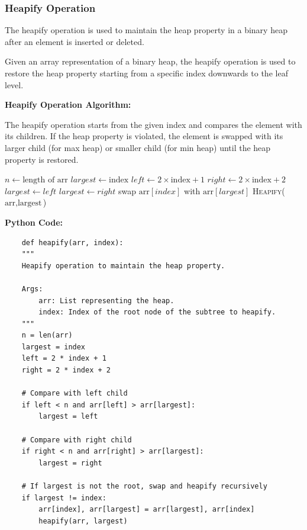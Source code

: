 \documentclass[12pt]{book} %
\begin{document}
\subsubsection{Heapify Operation}
The heapify operation is used to maintain the heap property in a binary heap after an element is inserted or deleted.

Given an array representation of a binary heap, the heapify operation is used to restore the heap property starting from a specific index downwards to the leaf level.

\textbf{Heapify Operation Algorithm:}

The heapify operation starts from the given index and compares the element with its children. If the heap property is violated, the element is swapped with its larger child (for max heap) or smaller child (for min heap) until the heap property is restored.
\FloatBarrier
\begin{algorithm}[H]
\caption{Heapify Operation}
\begin{algorithmic}[1]
    \State $n \gets \text{length of arr}$
    \State $largest \gets \text{index}$
    \State $left \gets 2 \times \text{index} + 1$
    \State $right \gets 2 \times \text{index} + 2$
        \State $largest \gets left$
    \EndIf
        \State $largest \gets right$
    \EndIf
        \State swap $\text{arr}[index]$ with $\text{arr}[largest]$
        \State \textsc{Heapify}($\text{arr}, \text{largest}$)
    \EndIf
\EndFunction
\end{algorithmic}
\end{algorithm}
\FloatBarrier
\textbf{Python Code:}
\FloatBarrier
\begin{lstlisting}
    def heapify(arr, index):
    """
    Heapify operation to maintain the heap property.
    
    Args:
        arr: List representing the heap.
        index: Index of the root node of the subtree to heapify.
    """
    n = len(arr)
    largest = index
    left = 2 * index + 1
    right = 2 * index + 2
    
    # Compare with left child
    if left < n and arr[left] > arr[largest]:
        largest = left
    
    # Compare with right child
    if right < n and arr[right] > arr[largest]:
        largest = right
    
    # If largest is not the root, swap and heapify recursively
    if largest != index:
        arr[index], arr[largest] = arr[largest], arr[index]
        heapify(arr, largest)
\end{lstlisting}
\end{document}

